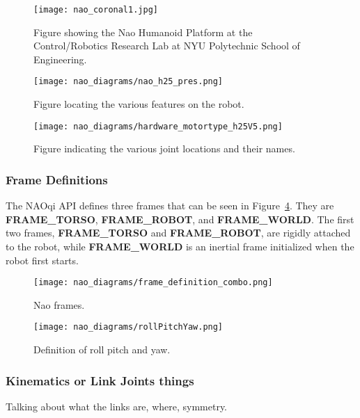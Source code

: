 \begin{figure}
\centering
\texttt{[image: nao\_coronal1.jpg]}
\caption{Figure showing the Nao Humanoid Platform at the Control/Robotics
         Research Lab at NYU Polytechnic School of Engineering.}
\label{fig:crrl_nao_coronal1}
\end{figure}

\begin{figure}
\centering
\texttt{[image: nao\_diagrams/nao\_h25\_pres.png]}
\caption{Figure locating the various features on the robot.}
\label{fig:nao_features1}
\end{figure}

\begin{figure}
\centering
\texttt{[image: nao\_diagrams/hardware\_motortype\_h25V5.png]}
\caption{Figure indicating the various joint locations and their names.}
\label{fig:nao_joints1}
\end{figure}

\FloatBarrier

\subsubsection{Frame Definitions}
The NAOqi API defines three frames that can be seen in Figure~\ref{fig:nao_frames1}.
They are \textbf{FRAME_TORSO}, \textbf{FRAME_ROBOT}, and \textbf{FRAME_WORLD}.
The first two frames, \textbf{FRAME_TORSO} and \textbf{FRAME_ROBOT}, are rigidly
attached to the robot, while \textbf{FRAME_WORLD} is an inertial frame initialized
when the robot first starts.



\begin{figure}
\centering
\texttt{[image: nao\_diagrams/frame\_definition\_combo.png]}
\caption{Nao frames.}
\label{fig:nao_frames1}
\end{figure}

\begin{figure}
\centerline{\texttt{[image: nao\_diagrams/rollPitchYaw.png]}
}
\caption{Definition of roll pitch and yaw.}
\label{fig:nao_rpy_def1}
\end{figure}

\subsubsection{Kinematics or Link Joints things}
Talking about what the links are, where, symmetry.

